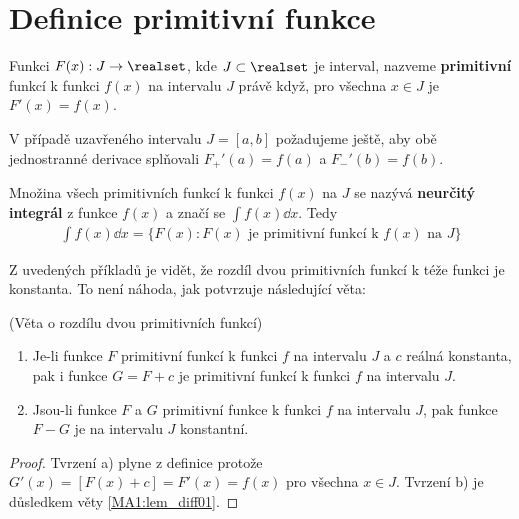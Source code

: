   \section{Definice primitivní funkce}  
    \begin{mdframed}[style=mdmathdef] 
      \begin{definition}\label{mai:def002}
        Funkci \(F(x): J\rightarrow \realset\), kde \(J\subset \realset\) je interval, nazveme
        \textbf{primitivní} funkcí k funkci \(f(x)\) na intervalu \(J\) právě když, pro všechna
        \(x\in J\) je \(F'(x) = f(x)\). 
        
        V případě uzavřeného intervalu \(J=[a,b]\) požadujeme ještě, aby obě jednostranné derivace
        splňovali \(F_+'(a)=f(a)\) a \(F_-'(b)=f(b)\). 
        
        Množina všech primitivních funkcí k funkci \(f(x)\) na \(J\) se nazývá \textbf{neurčitý
        integrál} z funkce \(f(x)\) a značí se \(\int f(x)\dd{x}\). Tedy
        \begin{gather}\label{mai:eq101}
          \int f(x)\dd{x} = \{F(x): \text{\(F(x)\) je primitivní funkcí k \(f(x)\) na \(J\)}\}
        \end{gather}
      \end{definition}
    \end{mdframed}
    
    
    Z uvedených příkladů je vidět, že rozdíl dvou primitivních funkcí k téže funkci je konstanta. To
    není náhoda, jak potvrzuje následující věta:

    \begin{mdframed}[style=mdmathlemma] 
      \begin{lemma}\label{mai:lemma008}(Věta o rozdílu dvou primitivních funkcí)
        \begin{enumerate}[noitemsep]
          \item Je-li funkce $F$ primitivní funkcí k funkci \(f\) na intervalu \(J\) a \(c\) reálná  
                konstanta, pak i funkce $G = F + c$ je primitivní funkcí k funkci \(f\) na intervalu 
                \(J\).
          \item Jsou-li funkce $F$ a $G$ primitivní funkce k funkci \(f\) na intervalu \(J\), pak 
          funkce
                $F-G$ je na intervalu \(J\) konstantní.
        \end{enumerate} 
        \begin{proof}
          Tvrzení a) plyne z definice protože $G'(x) = [F(x) + c] = F'(x) = f(x)$ pro všechna $x\in
          J$. Tvrzení b) je důsledkem věty \ref{MA1:lem_diff01}.
        \end{proof}
      \end{lemma}
    \end{mdframed}

